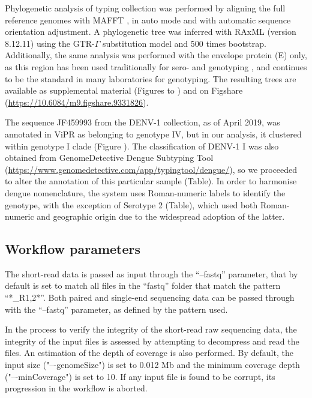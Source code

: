 Phylogenetic analysis of typing collection was performed by aligning the full reference genomes with MAFFT \citep{nakamura_parallelization_2018}, in auto mode and with automatic sequence orientation adjustment. A phylogenetic tree was inferred with RAxML (version 8.12.11) \citep{stamatakis_raxml_2014} using the GTR-$\Gamma$ substitution model and 500 times bootstrap. Additionally, the same analysis was performed with the envelope protein (E) only, as this region has been used traditionally for sero- and genotyping \citep{rico-hesse_molecular_1990, rico-hesse_microevolution_2003, lanciotti_rapid_1992, lanciotti_molecular_1997, klungthong_molecular_2004, zhang_clade_2005, zhang_structure_2006}, and continues to be the standard in many laboratories for genotyping. The resulting trees are available as supplemental material (Figures to ) and on Figshare (\url{https://10.6084/m9.figshare.9331826}).

The sequence JF459993 from the DENV-1 collection, as of April 2019, was annotated in ViPR as belonging to genotype IV, but in our analysis, it clustered within genotype I clade (Figure ). The classification of DENV-1 I was also obtained from GenomeDetective Dengue Subtyping Tool (\url{https://www.genomedetective.com/app/typingtool/dengue/}), so we proceeded to alter the annotation of this particular sample (Table). 
In order to harmonise dengue nomenclature, the system uses Roman-numeric labels to identify the genotype, with the exception of Serotype 2 (Table), which used both Roman-numeric and geographic origin due to the widespread adoption of the latter.

\subsection{Workflow parameters} \label{chap4_sup_workflow_params}

The short-read data is passed as input through the “--fastq” parameter, that by default is set to match all files in the “fastq” folder that match the pattern “*\_R{1,2}*”. Both paired and single-end sequencing data can be passed through with the “--fastq” parameter, as defined by the pattern used. 

In the process to verify the integrity of the short-read raw sequencing data, the integrity of the input files is assessed by attempting to decompress and read the files. An estimation of the depth of coverage is also performed. By default, the input size ("–-genomeSize") is set to 0.012 Mb and the minimum coverage depth ("–-minCoverage") is set to 10. If any input file is found to be corrupt, its progression in the workflow is aborted.

